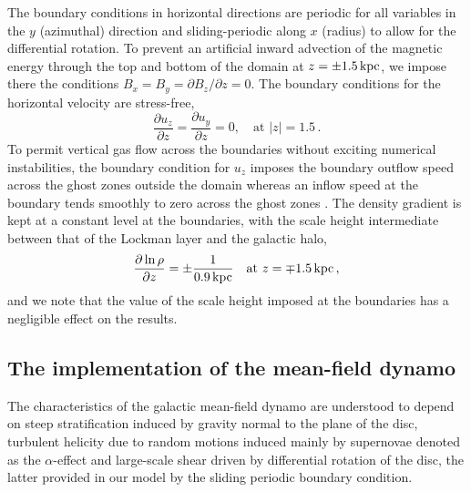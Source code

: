 \documentclass[fleqn,usenatbib]{mnras}
\newcommand\deriv[2]{\frac{\partial#1}{\partial#2}}%
\newcommand{\kpc}{\,{\rm kpc}}  %
\begin{document}
The boundary conditions in horizontal directions are periodic for all variables
in the $y$ (azimuthal) direction and sliding-periodic along $x$ (radius) to
allow for the differential rotation. To prevent an artificial inward advection
of the magnetic energy through the top and bottom of the domain at $z=\pm
1.5\kpc$, we impose there the conditions $B_x=B_y = \partial B_z/\partial z=0$.
The boundary conditions for the horizontal velocity are stress-free,
\begin{equation}
    \deriv{u_z}{z} = \deriv{u_y}{z} = 0,\quad \text{at } |z| = 1.5\,.
\end{equation}
To permit vertical gas flow across the boundaries without exciting numerical instabilities, the boundary condition for $u_z$ imposes the boundary outflow speed across the ghost zones outside the domain whereas an inflow speed at the boundary tends smoothly to zero across the ghost zones \citep{Gent_SN_ISM_1}. The density gradient is kept at a constant level at the boundaries, with the scale height intermediate between that of the Lockman layer and the galactic halo,
\begin{equation}
    \deriv{\ln\rho}{z} = \pm \frac{1}{0.9\kpc} \quad \text{at } z = \mp 1.5\kpc\,,
\end{equation}
and we note that the value of the scale height imposed at the boundaries has a negligible effect on the results.

\subsection{The implementation of the mean-field dynamo\label{sect:modelmf}}
The characteristics of the galactic mean-field dynamo are understood to depend
on steep stratification induced by gravity normal to the plane of the disc,
turbulent helicity due to random motions induced mainly by supernovae denoted
as the $\alpha$-effect and large-scale shear driven by differential rotation of
the disc, the latter provided in our model by the sliding periodic boundary
condition.
\end{document}
